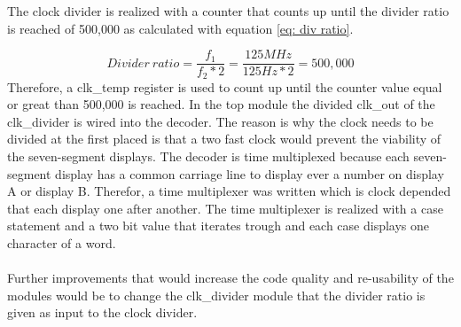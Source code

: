 The clock divider is realized with a counter that counts up until the divider ratio is reached of 500,000 as calculated with equation \ref{eq: div ratio}.

\begin{equation} \label{eq: div ratio}
	Divider\ ratio = \frac{f_1}{f_2 * 2} = \frac{125 MHz}{125 Hz * 2} = 500,000
\end{equation}
Therefore, a clk\_temp register is used to count up until the counter value equal or great than 500,000 is reached. In the top module the divided clk\_out of the clk\_divider is wired into the decoder. The reason is why the clock needs to be divided at the first placed is that a two fast clock would prevent the viability of the seven-segment displays. 
The decoder is time multiplexed because each seven-segment display has a common carriage line to display ever a number on display A or display B. Therefor, a time multiplexer was written which is clock depended that each display one after another.
The time multiplexer is realized with a case statement and a two bit value that iterates trough and each case displays one character of a word. 
\\ 
\\
Further improvements that would increase the code quality and re-usability of the  modules would be to change the clk\_divider module that the divider ratio is given as input to the clock divider. 
